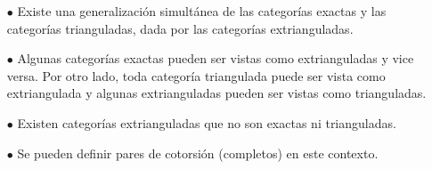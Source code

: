 \documentclass[preview]{standalone}
\begin{document}
\begin{center}
\begin{itemize}
                        \item[$\bullet$] Existe una generalización simultánea de las categorías exactas y las categorías trianguladas, dada por las categorías extrianguladas.
                        \item[$\bullet$] Algunas categorías exactas pueden ser vistas como extrianguladas y vice versa. Por otro lado, toda categoría triangulada puede ser vista como extriangulada y algunas extrianguladas pueden ser vistas como trianguladas.
                        \item[$\bullet$] Existen categorías extrianguladas que no son exactas ni trianguladas.
                        \item[$\bullet$] Se pueden definir pares de cotorsión (completos) en este contexto.
                    \end{itemize}
\end{center}
\end{document}
